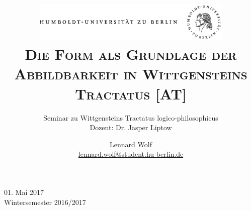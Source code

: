 \documentclass[a4paper, emulatestandardclasses, 12pt]{scrartcl}
\date{\vspace{-3ex}}
\begin{document}
\title{\vspace{5ex}
	\includegraphics*[width=0.72\textwidth]{images/hu_logo.png}\\
	\vspace{30pt}
	\scshape\LARGE{Die Form als Grundlage der Abbildbarkeit in Wittgensteins Tractatus [AT]}}
	
	\subtitle{\vspace{20pt}Seminar zu Wittgensteins Tractatus logico-philosophicus\\
	\vspace{6pt}
          Dozent: Dr. Jasper Liptow}


\author{\vspace{-4pt}Lennard Wolf\\
        \small{\href{mailto:lennard.wolf@student.hu-berlin.de}{lennard.wolf@student.hu-berlin.de}}}      

\maketitle

\vspace{\fill}

\begin{minipage}[b]{\textwidth}
    \centering
    \onehalfspacing
    \large   
    01. Mai 2017\\
    Wintersemester 2016/2017

    \vspace{-20mm} 
\end{minipage}%
\thispagestyle{empty}
\newpage
\clearpage
\thispagestyle{empty}
\tableofcontents
\newpage
\setcounter{page}{1}
\end{document}
